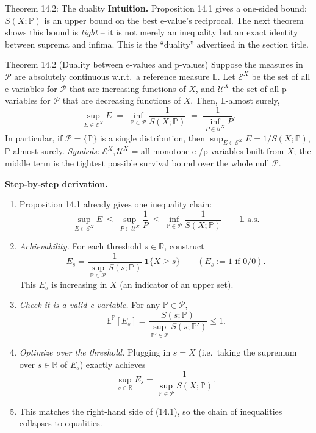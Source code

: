 \documentclass[aspectratio=169,10pt]{beamer}
\newcommand{\PP}{\mathbb{P}}
\newcommand{\EE}{\mathbb{E}}
\newcommand{\RR}{\mathbb{R}}
\newcommand{\calE}{\mathcal{E}}
\newcommand{\calU}{\mathcal{U}}
\newcommand{\calP}{\mathcal{P}}
\begin{document}
\begin{frame}[allowframebreaks]{Theorem 14.2: The duality}
  \textbf{Intuition.} Proposition 14.1 gives a one-sided bound: $S(X;\PP)$
  is an upper bound on the best e-value's reciprocal. The next theorem
  shows this bound is \emph{tight} -- it is not merely an inequality but an
  exact identity between suprema and infima. This is the ``duality''
  advertised in the section title.

  \begin{block}{Theorem 14.2 (Duality between e-values and p-values)}
    Suppose the measures in $\calP$ are absolutely continuous w.r.t.\ a
    reference measure $\mathbb{L}$. Let $\calE^X$ be the set of all
    e-variables for $\calP$ that are increasing functions of $X$, and
    $\calU^X$ the set of all p-variables for $\calP$ that are decreasing
    functions of $X$. Then, $\mathbb{L}$-almost surely,
    \[
      \sup_{E \in \calE^X} E \;=\; \inf_{\PP \in \calP} \frac{1}{S(X;\PP)}
      \;=\; \frac{1}{\inf_{P \in \calU^X} P}.
    \]
    In particular, if $\calP = \{\PP\}$ is a single distribution, then
    $\sup_{E\in\calE^X} E = 1/S(X;\PP)$, $\PP$-almost surely.
    \emph{Symbols:} $\calE^X, \calU^X$ = all monotone e-/p-variables built
    from $X$; the middle term is the tightest possible survival bound over
    the whole null $\calP$.
  \end{block}

  \framebreak

  \textbf{Step-by-step derivation.}
  \begin{enumerate}
    \item Proposition 14.1 already gives one inequality chain:
      \[
        \sup_{E\in\calE^X} E \ \leq\ \sup_{P\in\calU^X} \frac{1}{P}
        \ \leq\ \inf_{\PP\in\calP} \frac{1}{S(X;\PP)} \qquad \mathbb{L}\text{-a.s.}
        \tag{14.1}
      \]
    \item \emph{Achievability.} For each threshold $s \in \RR$, construct
      \[
        E_s = \frac{1}{\sup_{\PP\in\calP} S(s;\PP)}\ \mathbf{1}\{X \geq s\}
        \qquad (E_s := 1 \text{ if } 0/0).
      \]
      This $E_s$ is increasing in $X$ (an indicator of an upper set).
    \item \emph{Check it is a valid e-variable.} For any $\PP\in\calP$,
      \[
        \EE^{\PP}[E_s] = \frac{S(s;\PP)}{\sup_{\PP'\in\calP} S(s;\PP')} \leq 1.
      \]
    \item \emph{Optimize over the threshold.} Plugging in $s = X$ (i.e.\
      taking the supremum over $s\in\RR$ of $E_s$) exactly achieves
      \[
        \sup_{s\in\RR} E_s = \frac{1}{\sup_{\PP\in\calP} S(X;\PP)}.
      \]
    \item This matches the right-hand side of (14.1), so the chain of
      inequalities collapses to equalities.
  \end{enumerate}


\end{frame}
\end{document}
